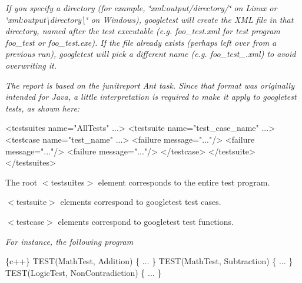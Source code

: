 {\itshape If you specify a directory (for example, {\ttfamily \char`\"{}xml\+:output/directory/\char`\"{}} on Linux or {\ttfamily \char`\"{}xml\+:output\textbackslash{}directory\textbackslash{}\char`\"{}} on Windows), googletest will create the X\+ML file in that directory, named after the test executable (e.\+g. {\ttfamily foo\+\_\+test.\+xml} for test program {\ttfamily foo\+\_\+test} or {\ttfamily foo\+\_\+test.\+exe}). If the file already exists (perhaps left over from a previous run), googletest will pick a different name (e.\+g. {\ttfamily foo\+\_\+test\+\_.\+xml}) to avoid overwriting it.}

{\itshape The report is based on the {\ttfamily junitreport} Ant task. Since that format was originally intended for Java, a little interpretation is required to make it apply to googletest tests, as shown here\+:}

{\itshape 
\begin{DoxyCode}
<\textcolor{keywordtype}{testsuites} \textcolor{keyword}{name}=\textcolor{stringliteral}{"AllTests"} ...>
  <\textcolor{keywordtype}{testsuite} \textcolor{keyword}{name}=\textcolor{stringliteral}{"test\_case\_name"} ...>
    <\textcolor{keywordtype}{testcase}    \textcolor{keyword}{name}=\textcolor{stringliteral}{"test\_name"} ...>
      <\textcolor{keywordtype}{failure} \textcolor{keyword}{message}=\textcolor{stringliteral}{"..."}/>
      <\textcolor{keywordtype}{failure} \textcolor{keyword}{message}=\textcolor{stringliteral}{"..."}/>
      <\textcolor{keywordtype}{failure} \textcolor{keyword}{message}=\textcolor{stringliteral}{"..."}/>
    </\textcolor{keywordtype}{testcase}>
  </\textcolor{keywordtype}{testsuite}>
</\textcolor{keywordtype}{testsuites}>
\end{DoxyCode}
}

{\itshape 
\begin{DoxyItemize}
\item The root {\ttfamily $<$testsuites$>$} element corresponds to the entire test program.
\item {\ttfamily $<$testsuite$>$} elements correspond to googletest test cases.
\item {\ttfamily $<$testcase$>$} elements correspond to googletest test functions.
\end{DoxyItemize}}

{\itshape For instance, the following program}

{\itshape 
\begin{DoxyCode}
\{c++\}
TEST(MathTest, Addition) \{ ... \}
TEST(MathTest, Subtraction) \{ ... \}
TEST(LogicTest, NonContradiction) \{ ... \}
\end{DoxyCode}
}

